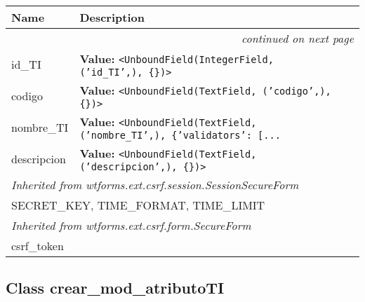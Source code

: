     \vspace{-1cm}
\hspace{\varindent}\begin{longtable}{|p{\varnamewidth}|p{\vardescrwidth}|l}
\cline{1-2}
\cline{1-2} \centering \textbf{Name} & \centering \textbf{Description}& \\
\cline{1-2}
\endhead\cline{1-2}\multicolumn{3}{r}{\small\textit{continued on next page}}\\\endfoot\cline{1-2}
\endlastfoot\raggedright i\-d\-\_\-T\-I\- & \raggedright \textbf{Value:} 
{\tt {\textless}UnboundField(IntegerField, ('id\_TI',), \{\}){\textgreater}}&\\
\cline{1-2}
\raggedright c\-o\-d\-i\-g\-o\- & \raggedright \textbf{Value:} 
{\tt {\textless}UnboundField(TextField, ('codigo',), \{\}){\textgreater}}&\\
\cline{1-2}
\raggedright n\-o\-m\-b\-r\-e\-\_\-T\-I\- & \raggedright \textbf{Value:} 
{\tt {\textless}UnboundField(TextField, ('nombre\_TI',), \{'validators': [\texttt{...}}&\\
\cline{1-2}
\raggedright d\-e\-s\-c\-r\-i\-p\-c\-i\-o\-n\- & \raggedright \textbf{Value:} 
{\tt {\textless}UnboundField(TextField, ('descripcion',), \{\}){\textgreater}}&\\
\cline{1-2}
\multicolumn{2}{|l|}{\textit{Inherited from wtforms.ext.csrf.session.SessionSecureForm}}\\
\multicolumn{2}{|p{\varwidth}|}{\raggedright SECRET\_KEY, TIME\_FORMAT, TIME\_LIMIT}\\
\cline{1-2}
\multicolumn{2}{|l|}{\textit{Inherited from wtforms.ext.csrf.form.SecureForm}}\\
\multicolumn{2}{|p{\varwidth}|}{\raggedright csrf\_token}\\
\cline{1-2}
\end{longtable}



\subsection{Class crear\_mod\_atributoTI}

